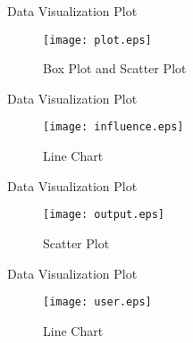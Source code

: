 \documentclass[
size=14pt,
paper=smartboard,  %
mode=present, 		%
display=slides, 	%
style=tuliplab,  	%
pauseslide,
fleqn,leqno]{powerdot}
\begin{document}
	\begin{slide}{Data Visualization Plot}
		\begin{figure}
			\centering
			\texttt{[image: plot.eps]}
			\caption{Box Plot and Scatter Plot} \label{framework}
		\end{figure}
	\end{slide}
	
	\begin{slide}[toc=,bm=]{Data Visualization Plot}
		\begin{figure}
			\centering
			\texttt{[image: influence.eps]}
			\caption{Line Chart} \label{framework}
		\end{figure}
	\end{slide}
	
	\begin{slide}[toc=,bm=]{Data Visualization Plot}
		\begin{figure}
			\centering
			\texttt{[image: output.eps]}
			\caption{Scatter Plot} \label{framework}
		\end{figure}
	\end{slide}
	
	\begin{slide}[toc=,bm=]{Data Visualization Plot}
		\begin{figure}
			\begin{center}
				\texttt{[image: user.eps]}
				\caption{Line Chart} \label{framework}
			\end{center}
		\end{figure}
	\end{slide}
	
\end{document}
